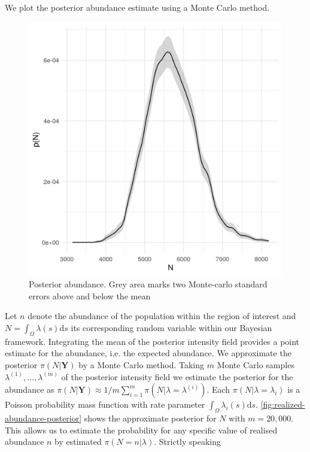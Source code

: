 \documentclass{stylefile16/statsoc}
\newcommand{\bm}{\boldsymbol}  %
\begin{document}
We plot the posterior abundance estimate using a Monte Carlo method.
\begin{figure}[!htb]
	\begin{center}
		\includegraphics[scale=0.525]{figures/N_posterior.png}
		\caption{Posterior abundance.  Grey area marks two Monte-carlo standard errors above and below the mean}
		\label{fig:realized-abundance-posterior}
	\end{center}
\end{figure}
Let $n$ denote the abundance of the population within the region of interest and $N = \int_{\Omega}\lambda(s)\mathrm{d}s$ its corresponding random variable within our Bayesian framework.  Integrating the mean of the posterior intensity field provides a point estimate for the abundance, i.e. the expected abundance.  We approximate the posterior $\pi(N | \bm{Y})$ by a Monte Carlo method.  Taking $m$ Monte Carlo samples  $\lambda^{(1)}, \ldots, \lambda^{(m)}$ of the posterior intensity field we estimate the posterior for the abundance as $\pi(N | \bm{Y}) \approx 1 / m \sum_{i=1}^m \pi (N | \lambda = \lambda^{(i)})$. Each $\pi(N | \lambda = \lambda_i)$ is a Poisson probability mass function with rate parameter $\int_{\Omega}\lambda_i(s)\mathrm{d}s$. \autoref{fig:realized-abundance-posterior} shows the approximate posterior for $N$ with $m = 20,000$.  This allows us to estimate the probability for any specific value of realised abundance $n$ by estimated $\pi(N = n | \lambda)$.  Strictly speaking
\end{document}
